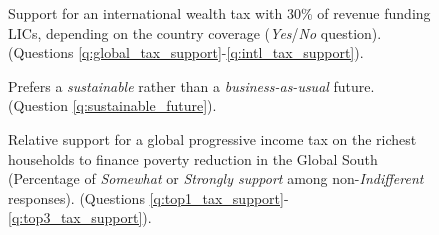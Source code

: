 \begin{figure}[h!]
    \caption[Support for an international wealth depending on country coverage]{Support for an international wealth tax with 30\% of revenue funding LICs, depending on the country coverage (\textit{Yes}/\textit{No} question). (Questions \ref{q:global_tax_support}-\ref{q:intl_tax_support}).
    }\label{fig:wealth_tax}
\end{figure}

\begin{figure}[h!]
    \caption[Prefers a sustainable future]{Prefers a \textit{sustainable} rather than a \textit{business-as-usual} future. (Question \ref{q:sustainable_future}).
    }\label{fig:sustainable_future}
\end{figure}

\begin{figure}[h!]
    \caption[Relative support for a global income tax on the richest to fund LICs]{Relative support for a global progressive income tax on the richest households to finance poverty reduction in the Global South (Percentage of \textit{Somewhat} or \textit{Strongly support} among non-\textit{Indifferent} responses). (Questions \ref{q:top1_tax_support}-\ref{q:top3_tax_support}).
    }\label{fig:top_tax_share}
\end{figure}

